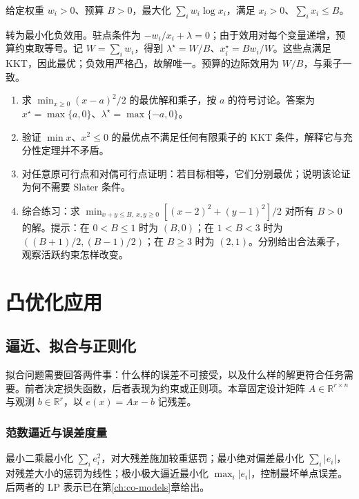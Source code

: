 \documentclass[UTF8,12pt,a4paper,fontset=fandol]{ctexbook}
\begin{document}
\begin{example}[比例资源分配]
给定权重 $w_i>0$、预算 $B>0$，最大化 $\sum_iw_i\log x_i$，满足 $x_i>0$、$\sum_i x_i\leq B$。
\end{example}
\begin{solve}
转为最小化负效用。驻点条件为 $-w_i/x_i+\lambda=0$；由于效用对每个变量递增，预算约束取等号。记 $W=\sum_iw_i$，得到 $\lambda^\star=W/B$、$x_i^\star=Bw_i/W$。这些点满足 KKT，因此最优；负效用严格凸，故解唯一。预算的边际效用为 $W/B$，与乘子一致。
\end{solve}
\begin{enumerate}
 \item 求 $\min_{x\geq0}(x-a)^2/2$ 的最优解和乘子，按 $a$ 的符号讨论。答案为 $x^\star=\max\{a,0\}$、$\lambda^\star=\max\{-a,0\}$。
 \item 验证 $\min x$、$x^2\leq0$ 的最优点不满足任何有限乘子的 KKT 条件，解释它与充分性定理并不矛盾。
 \item 对任意原可行点和对偶可行点证明：若目标相等，它们分别最优；说明该论证为何不需要 Slater 条件。
 \item 综合练习：求 $\min_{x+y\leq B,\ x,y\geq0}[(x-2)^2+(y-1)^2]/2$ 对所有 $B>0$ 的解。提示：在 $0<B\leq1$ 时为 $(B,0)$；在 $1<B<3$ 时为 $((B+1)/2,(B-1)/2)$；在 $B\geq3$ 时为 $(2,1)$。分别给出合法乘子，观察活跃约束怎样改变。
\end{enumerate}

\part{凸优化应用}

\chapter{逼近、拟合与正则化}
\label{ch:co-fitting}

拟合问题需要回答两件事：什么样的误差不可接受，以及什么样的解更符合任务需要。前者决定损失函数，后者表现为约束或正则项。本章固定设计矩阵 $A\in\mathbb R^{r\times n}$ 与观测 $b\in\mathbb R^r$，以 $e(x)=Ax-b$ 记残差。

\section{范数逼近与误差度量}

最小二乘最小化 $\sum_i e_i^2$，对大残差施加较重惩罚；最小绝对偏差最小化 $\sum_i|e_i|$，对残差大小的惩罚为线性；极小极大逼近最小化 $\max_i|e_i|$，控制最坏单点误差。后两者的 LP 表示已在第\ref{ch:co-models}章给出。
\end{document}
